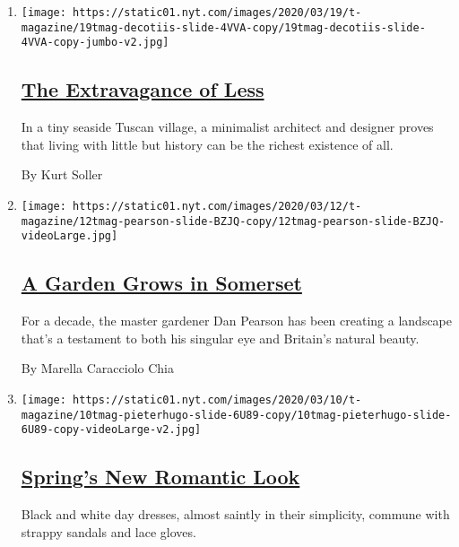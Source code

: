 \begin{enumerate}
\def\labelenumi{\arabic{enumi}.}
\item
  \texttt{[image: https://static01.nyt.com/images/2020/03/19/t-magazine/19tmag-decotiis-slide-4VVA-copy/19tmag-decotiis-slide-4VVA-copy-jumbo-v2.jpg]}

  \hypertarget{the-extravagance-of-less}{%
  \subsection{\texorpdfstring{\href{/2020/03/19/t-magazine/vincenzo-de-cotiis-home-tuscany.html}{The
  Extravagance of
  Less}}{The Extravagance of Less}}\label{the-extravagance-of-less}}

  In a tiny seaside Tuscan village, a minimalist architect and designer
  proves that living with little but history can be the richest
  existence of all.

  By Kurt Soller
\item
  \texttt{[image: https://static01.nyt.com/images/2020/03/12/t-magazine/12tmag-pearson-slide-BZJQ-copy/12tmag-pearson-slide-BZJQ-videoLarge.jpg]}

  \hypertarget{a-garden-grows-in-somerset}{%
  \subsection{\texorpdfstring{\href{/2020/03/12/t-magazine/master-gardener-dan-pearson.html}{A
  Garden Grows in
  Somerset}}{A Garden Grows in Somerset}}\label{a-garden-grows-in-somerset}}

  For a decade, the master gardener Dan Pearson has been creating a
  landscape that's a testament to both his singular eye and Britain's
  natural beauty.

  By Marella Caracciolo Chia
\item
  \texttt{[image: https://static01.nyt.com/images/2020/03/10/t-magazine/10tmag-pieterhugo-slide-6U89-copy/10tmag-pieterhugo-slide-6U89-copy-videoLarge-v2.jpg]}

  \hypertarget{springs-new-romantic-look}{%
  \subsection{\texorpdfstring{\href{/2020/03/10/t-magazine/spring-fashion-romantic-look.html}{Spring's
  New Romantic
  Look}}{Spring's New Romantic Look}}\label{springs-new-romantic-look}}

  Black and white day dresses, almost saintly in their simplicity,
  commune with strappy sandals and lace gloves.


\end{enumerate}
